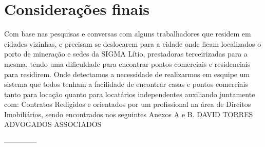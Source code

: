 \chapter{Considerações finais}
Com base nas pesquisas e conversas com alguns trabalhadores que residem em cidades vizinhas, e precisam se deslocarem para a cidade onde ficam localizados o porto de mineração e sedes da SIGMA Lítio, prestadoras terceirizadas para a mesma, tendo uma dificuldade para encontrar pontos comerciais e residenciais para residirem.
Onde detectamos a necessidade de realizarmos em esquipe um sistema que todos tenham a facilidade de encontrar casas e pontos comerciais tanto para locação quanto para locatários independentes auxiliando juntamente com: Contratos Redigidos e orientados por um profissional na área de Direitos Imobiliários, sendo encontrados nos seguintes Anexos A e B. DAVID TORRES ADVOGADOS ASSOCIADOS



--------------





